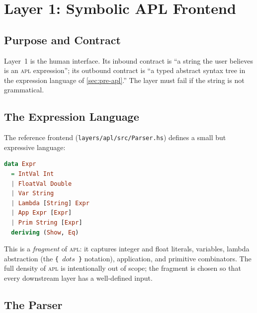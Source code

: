 \chapter{Layer 1: Symbolic APL Frontend}
\label{ch:apl}

\section{Purpose and Contract}
\label{sec:apl-purpose}

Layer~1 is the human interface. Its inbound contract is ``a string the user
believes is an \textsc{apl} expression''; its outbound contract is ``a typed
abstract syntax tree in the expression language of \cref{sec:pre-apl}.'' The
layer must fail if the string is not grammatical.

\section{The Expression Language}
\label{sec:apl-expr}

The reference frontend (\texttt{layers/apl/src/Parser.hs}) defines a small but
expressive language:
\begin{lstlisting}[language=Haskell,caption={Expression datatype (Parser.hs).},label=lst:apl-expr]
data Expr
  = IntVal Int
  | FloatVal Double
  | Var String
  | Lambda [String] Expr
  | App Expr [Expr]
  | Prim String [Expr]
  deriving (Show, Eq)
\end{lstlisting}
This is a \emph{fragment} of \textsc{apl}: it captures integer and float
literals, variables, lambda abstraction (the \texttt{\{ \ensuremath{dots} \}} notation),
application, and primitive combinators. The full density of \textsc{apl} is
intentionally out of scope; the fragment is chosen so that every downstream
layer has a well-defined input.

\section{The Parser}
\label{sec:apl-parser}


